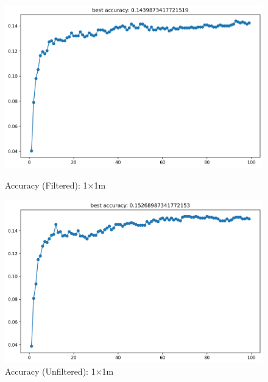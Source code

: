 \documentclass[runningheads]{llncs}
\begin{document}
\begin{figure}[H]
	\centering
	\begin{minipage}{0.49\textwidth}
		\centering
		\includegraphics[width=\textwidth]{figures/filtered/xgb_softmax_acc_1.png}
		\caption*{Accuracy (Filtered): 1×1m}
	\end{minipage}
	\hfill
	\begin{minipage}{0.49\textwidth}
		\centering
		\includegraphics[width=\textwidth]{figures/unfiltered/xgb_softmax_acc_1.png}
		\caption*{Accuracy (Unfiltered): 1×1m}
	\end{minipage}
\end{figure}
\end{document}
